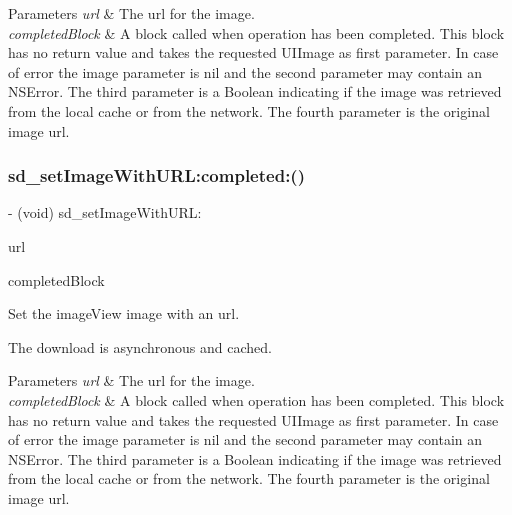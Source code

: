 \begin{DoxyParams}{Parameters}
{\em url} & The url for the image. \\
\hline
{\em completed\+Block} & A block called when operation has been completed. This block has no return value and takes the requested U\+I\+Image as first parameter. In case of error the image parameter is nil and the second parameter may contain an N\+S\+Error. The third parameter is a Boolean indicating if the image was retrieved from the local cache or from the network. The fourth parameter is the original image url. \\
\hline
\end{DoxyParams}
\mbox{\label{category_u_i_image_view_07_web_cache_08_a237803264855201b0f1150409fcbd74d}} 
\subsubsection{\texorpdfstring{sd\+\_\+set\+Image\+With\+U\+R\+L\+:completed\+:()}{sd\_setImageWithURL:completed:()}\hspace{0.1cm}{\footnotesize\ttfamily [2/3]}}
{\footnotesize\ttfamily -\/ (void) sd\+\_\+set\+Image\+With\+U\+R\+L\+: \begin{DoxyParamCaption}\item[{(N\+S\+U\+RL $\ast$)}]{url }\item[{completed:(S\+D\+Web\+Image\+Completion\+Block)}]{completed\+Block }\end{DoxyParamCaption}}

Set the image\+View {\ttfamily image} with an {\ttfamily url}.

The download is asynchronous and cached.


\begin{DoxyParams}{Parameters}
{\em url} & The url for the image. \\
\hline
{\em completed\+Block} & A block called when operation has been completed. This block has no return value and takes the requested U\+I\+Image as first parameter. In case of error the image parameter is nil and the second parameter may contain an N\+S\+Error. The third parameter is a Boolean indicating if the image was retrieved from the local cache or from the network. The fourth parameter is the original image url. \\
\hline
\end{DoxyParams}
\mbox{\label{category_u_i_image_view_07_web_cache_08_a237803264855201b0f1150409fcbd74d}} 
